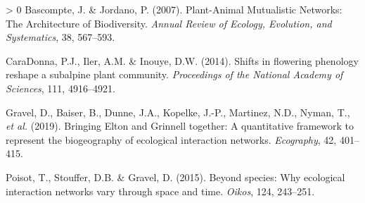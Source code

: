 \documentclass[11pt]{article}
\newlength{\cslhangindent}
\newenvironment{CSLReferences}[3] %
 {%
  \setlength{\parindent}{0pt}
  \ifodd #1 \everypar{\setlength{\hangindent}{\cslhangindent}}\ignorespaces\fi
  \ifnum #2 > 0
  \setlength{\parskip}{#2\baselineskip}
  \fi
 }%
 {}
\begin{document}
\hypertarget{refs}{}
\begin{CSLReferences}{1}{0}
\leavevmode\hypertarget{ref-Bascompte2007PlaMut}{}%
Bascompte, J. \& Jordano, P. (2007). Plant-Animal Mutualistic Networks:
The Architecture of Biodiversity. \emph{Annual Review of Ecology,
Evolution, and Systematics}, 38, 567--593.

\leavevmode\hypertarget{ref-CaraDonna2014ShiFlo}{}%
CaraDonna, P.J., Iler, A.M. \& Inouye, D.W. (2014). Shifts in flowering
phenology reshape a subalpine plant community. \emph{Proceedings of the
National Academy of Sciences}, 111, 4916--4921.

\leavevmode\hypertarget{ref-Gravel2019BriElt}{}%
Gravel, D., Baiser, B., Dunne, J.A., Kopelke, J.-P., Martinez, N.D.,
Nyman, T., \emph{et al.} (2019). Bringing Elton and Grinnell together: A
quantitative framework to represent the biogeography of ecological
interaction networks. \emph{Ecography}, 42, 401--415.

\leavevmode\hypertarget{ref-Poisot2015SpeWhy}{}%
Poisot, T., Stouffer, D.B. \& Gravel, D. (2015). Beyond species: Why
ecological interaction networks vary through space and time.
\emph{Oikos}, 124, 243--251.

\end{CSLReferences}
\end{document}
